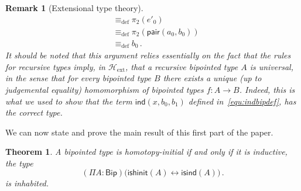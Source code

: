 \documentclass[10pt,a4paper,oneside,reqno]{amsart}
\numberwithin{equation}{section}
\theoremstyle{mythm}
\newtheorem{theorem}{Theorem}[section]
\theoremstyle{mydef}
\theoremstyle{myrmk}
\newtheorem*{remark*}{Remark}
\newcommand{\ie}{\text{i.e.\ }}
\newcommand{\deq}{\equiv}
\newcommand{\defeq}{\deq_{\mathrm{def}}}
\newcommand{\co}{\colon}
\newcommand{\Hext}{\mathcal{H}_{\mathrm{ext}}}
\newcommand{\pair}{\mathsf{pair}}
\newcommand{\ind}{\mathsf{ind}}
\newcommand{\Bip}{\mathsf{Bip}}
\newcommand{\ishinit}{\mathsf{ishinit}}
\newcommand{\isind}{\mathsf{isind}}
\begin{document}
\begin{remark*}[Extensional type theory]
\begin{align*}
 & \defeq \pi_2 (e'_0) \\
 & \defeq \pi_2 (\pair(a_0, b_0)) \\
 & \defeq b_0 \, .
\end{align*}
It should be noted that this argument relies essentially on the fact that the rules for recursive types
imply, in $\Hext$, that a recursive bipointed type $A$ is universal, in the sense that for every bipointed 
type $B$ there exists a unique (up to judgemental equality) homomorphism of bipointed types $f \co A \to B$.
Indeed, this is what we used to show that the term $\ind(x, b_0, b_1)$ defined in~\eqref{equ:indbipdef}, has
the correct type.
\end{remark*}

\medskip



\medskip

We can now state and prove the main result of this first part of the paper.


\begin{theorem}\label{lem:BoolMainInt} A bipointed type is homotopy-initial if and only if it is inductive, 
\ie the type
\[
(\Pi A \co \Bip) \big( \ishinit(A) \leftrightarrow \isind(A) \big) \, .
\]
is inhabited.
\end{theorem}
\end{document}
